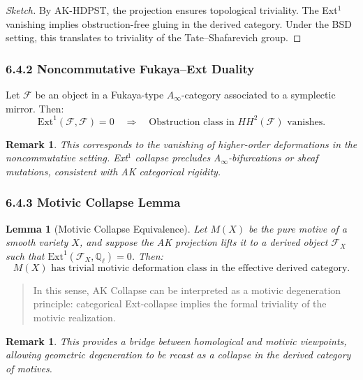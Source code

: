 \documentclass[11pt]{article}
\newtheorem{remark}[theorem]{Remark}
\newtheorem{lemma}[theorem]{Lemma}
\begin{document}
\begin{proof}[Sketch]
By AK-HDPST, the projection ensures topological triviality. The Ext$^1$ vanishing implies obstruction-free gluing in the derived category. Under the BSD setting, this translates to triviality of the Tate–Shafarevich group.
\end{proof}

\subsubsection*{6.4.2 Noncommutative Fukaya–Ext Duality}

\begin{proposition}
Let \( \mathcal{F} \) be an object in a Fukaya-type $A_\infty$-category associated to a symplectic mirror. Then:
\[
\mathrm{Ext}^1(\mathcal{F}, \mathcal{F}) = 0 \quad \Rightarrow \quad \text{Obstruction class in } HH^2(\mathcal{F}) \text{ vanishes.}
\]
\end{proposition}

\begin{remark}
This corresponds to the vanishing of higher-order deformations in the noncommutative setting. Ext$^1$ collapse precludes A$_\infty$-bifurcations or sheaf mutations, consistent with AK categorical rigidity.
\end{remark}

\subsubsection*{6.4.3 Motivic Collapse Lemma}

\begin{lemma}[Motivic Collapse Equivalence]
Let \( M(X) \) be the pure motive of a smooth variety \( X \), and suppose the AK projection lifts it to a derived object \( \mathcal{F}_X \) such that \( \mathrm{Ext}^1(\mathcal{F}_X, \mathbb{Q}_\ell) = 0 \). Then:
\[
M(X) \text{ has trivial motivic deformation class in the effective derived category.}
\]
\end{lemma}

\begin{quote}
In this sense, AK Collapse can be interpreted as a motivic degeneration principle:  
categorical Ext-collapse implies the formal triviality of the motivic realization.
\end{quote}

\begin{remark}
This provides a bridge between homological and motivic viewpoints, allowing geometric degeneration to be recast as a collapse in the derived category of motives.
\end{remark}
\end{document}

